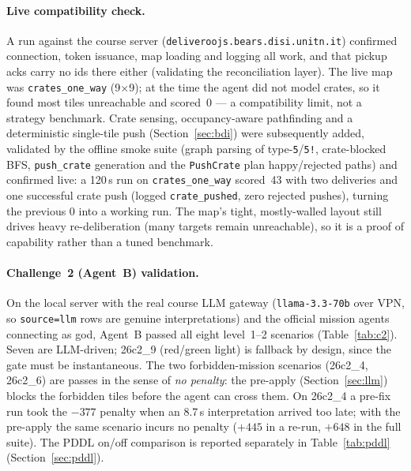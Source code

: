 \paragraph{Live compatibility check.} A run against the course server
(\texttt{deliveroojs.bears.disi.unitn.it}) confirmed connection, token
issuance, map loading and logging all work, and that pickup acks carry no ids
there either (validating the reconciliation layer). The live map was
\texttt{crates\_one\_way} (9$\times$9); at the time the agent did not model
crates, so it found most tiles unreachable and scored~0 --- a compatibility
limit, not a strategy benchmark. Crate sensing, occupancy-aware pathfinding and
a deterministic single-tile push (Section~\ref{sec:bdi}) were subsequently
added, validated by the offline smoke suite (graph parsing of
type-\texttt{5}/\texttt{5!}, crate-blocked BFS, \texttt{push\_crate} generation
and the \texttt{PushCrate} plan happy/rejected paths) and confirmed live: a
120\,s run on \texttt{crates\_one\_way} scored~43 with two deliveries and one
successful crate push (logged \texttt{crate\_pushed}, zero rejected pushes),
turning the previous 0 into a working run. The map's tight, mostly-walled layout
still drives heavy re-deliberation (many targets remain unreachable), so it is a
proof of capability rather than a tuned benchmark.

\paragraph{Challenge~2 (Agent~B) validation.} On the local server with the real
course LLM gateway (\texttt{llama-3.3-70b} over VPN, so \texttt{source=llm} rows
are genuine interpretations) and the official mission agents connecting as god,
Agent~B passed all eight level~1--2 scenarios (Table~\ref{tab:c2}). Seven are
LLM-driven; 26c2\_9 (red/green light) is fallback by design, since the gate must
be instantaneous. The two forbidden-mission scenarios (26c2\_4, 26c2\_6) are
passes in the sense of \emph{no penalty}: the pre-apply (Section~\ref{sec:llm})
blocks the forbidden tiles before the agent can cross them. On 26c2\_4 a pre-fix
run took the $-377$ penalty when an 8.7\,s interpretation arrived too late;
with the pre-apply the same scenario incurs no penalty ($+445$ in a re-run,
$+648$ in the full suite). The PDDL on/off comparison is reported separately in
Table~\ref{tab:pddl} (Section~\ref{sec:pddl}).

